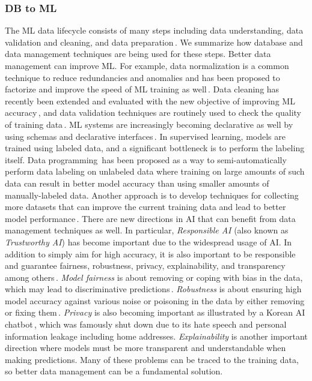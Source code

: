 \documentclass[11pt]{article}
\begin{document}
\subsubsection{DB to ML}
The ML data lifecycle consists of many steps including data understanding, data validation and cleaning, and data preparation\,\cite{DBLP:journals/sigmod/PolyzotisRWZ18}. We summarize how database and data management techniques are being used for these steps.
Better data management can improve ML. For example, data normalization is a common technique to reduce redundancies and anomalies and has been proposed to factorize and improve the speed of ML training as well\,\cite{DBLP:journals/pvldb/ChenKNP17}. Data cleaning has recently been extended and evaluated with the new objective of improving ML accuracy\,\cite{DBLP:conf/icde/LiRBZCZ21}, and data validation techniques are routinely used to check the quality of training data\,\cite{DBLP:conf/kdd/BaylorBCFFHHIJK17}. ML systems are increasingly becoming declarative as well by using schemas and declarative interfaces\,\cite{DBLP:journals/cacm/MolinoR22}. In supervised learning, models are trained using labeled data, and a significant bottleneck is to perform the labeling itself. Data programming\,\cite{DBLP:journals/vldb/RatnerBEFWR20} has been proposed as a way to semi-automatically perform data labeling on unlabeled data where training on large amounts of such data can result in better model accuracy than using smaller amounts of manually-labeled data. 
Another approach is to develop techniques for collecting more datasets that can improve the current training data and lead to better model performance\,\cite{DBLP:journals/tkde/RohHW21}. 
There are new directions in AI that can benefit from data management techniques as well. In particular, \emph{Responsible AI} (also known as \emph{Trustworthy AI}) has become important due to the widespread usage of AI. In addition to simply aim for high accuracy, it is also important to be responsible and guarantee fairness, robustness, privacy, explainability, and transparency among others\,\cite{trustworthy-ai}. \emph{Model fairness} is about removing or coping with bias in the data, which may lead to discriminative predictions\,\cite{compas}. \emph{Robustness} is about ensuring high model accuracy against various noise or poisoning in the data by either removing or fixing them\,\cite{DBLP:conf/icml/SongK019}. \emph{Privacy} is also becoming important as illustrated by a Korean AI chatbot\,\cite{leeluda}, which was famously shut down due to its hate speech and personal information leakage including home addresses. \emph{Explainability} is another important direction where models must be more transparent and understandable when making predictions. Many of these problems can be traced to the training data, so better data management can be a fundamental solution. 
\end{document}
